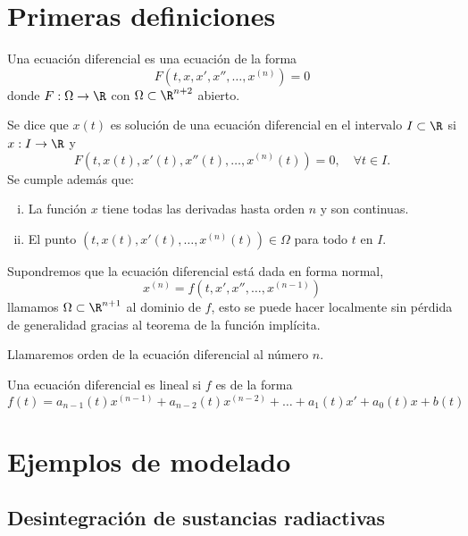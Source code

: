 \documentclass[../main.tex]{subfiles}
\begin{document}
\section{Primeras definiciones}

\begin{definition}
	Una ecuación diferencial es una ecuación de la forma
	\[F(t, x, x', x'', \dots, x^{(n)}) = 0\]
	donde \(F : \Omega \to \R\) con \(\Omega \subset \R^{n + 2}\) abierto.
\end{definition}

\begin{definition}
	Se dice que \(x(t)\) es solución de una ecuación diferencial en el intervalo
	\(I \subset \R\) si \(x : I \to \R\) y
	\[F(t, x(t), x'(t), x''(t), \dots, x^{(n)}(t)) = 0, \quad \forall t \in I.\]
	Se cumple además que:
	\begin{enumerate}[i)]
		\item La función \(x\) tiene todas las derivadas hasta orden \(n\) y son
			continuas.
		\item El punto \((t, x(t), x'(t), \dots, x^{(n)}(t)) \in \Omega\) para
			todo \(t\) en \(I\).
	\end{enumerate}
\end{definition}

Supondremos que la ecuación diferencial está dada en forma normal,
\[x^{(n)} = f(t, x', x'', \dots, x^{(n - 1)})\]
llamamos \(\Omega \subset \R^{n + 1}\) al dominio de \(f\), esto se puede hacer
localmente sin pérdida de generalidad gracias al teorema de la función
implícita.

\begin{remark}
	Llamaremos orden de la ecuación diferencial al número \(n\).
\end{remark}

\begin{definition}
	Una ecuación diferencial es lineal si \(f\) es de la forma
	\[f(t) = a_{n - 1}(t)x^{(n - 1)} + a_{n - 2}(t)x^{(n - 2)} +
		\dots + a_1(t)x' + a_0(t)x + b(t)\]
\end{definition}

\section{Ejemplos de modelado}

\subsection{Desintegración de sustancias radiactivas}
\end{document}
